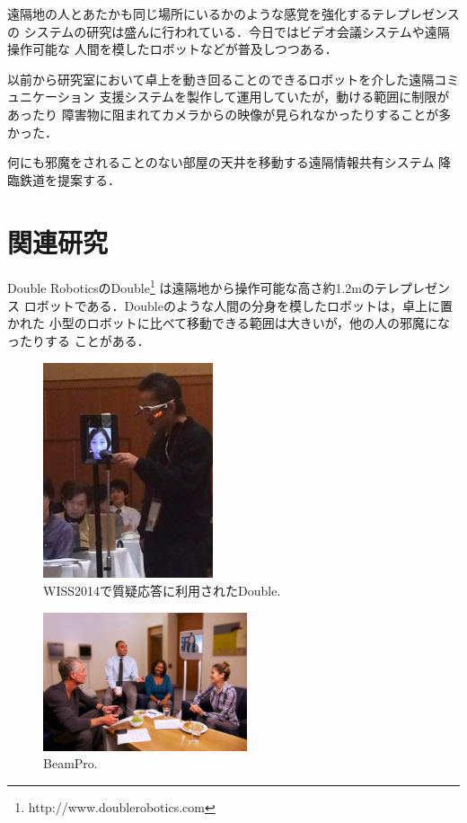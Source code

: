 \documentclass[submit,techreq]{ipsj}
\begin{document}
遠隔地の人とあたかも同じ場所にいるかのような感覚を強化するテレプレゼンスの
システムの研究は盛んに行われている．今日ではビデオ会議システムや遠隔操作可能な
人間を模したロボットなどが普及しつつある．

以前から研究室において卓上を動き回ることのできるロボットを介した遠隔コミュニケーション
支援システムを製作して運用していたが\cite{Hirota:Korin}，動ける範囲に制限があったり
障害物に阻まれてカメラからの映像が見られなかったりすることが多かった．

何にも邪魔をされることのない部屋の天井を移動する遠隔情報共有システム
降臨鉄道を提案する．

\section{関連研究}

Double RoboticsのDouble\footnote{
  \textsf{http://www.doublerobotics.com}
}
は遠隔地から操作可能な高さ約1.2mのテレプレゼンス
ロボットである．Doubleのような人間の分身を模したロボットは，卓上に置かれた
小型のロボットに比べて移動できる範囲は大きいが，他の人の邪魔になったりする
ことがある．

\begin{figure}[H]
\centerline{\includegraphics[width=50mm]{figures/b74f4564d4b38d12e48fcf80fef96def.png}}
\caption{WISS2014で質疑応答に利用されたDouble.}
\label{double}
\end{figure}

\begin{figure}[H]
\centerline{\includegraphics[width=60mm]{figures/2c092d5d4467d5b2572acef0c95b22ff.png}}
\caption{BeamPro.}
\label{beampro}
\end{figure}
\end{document}
